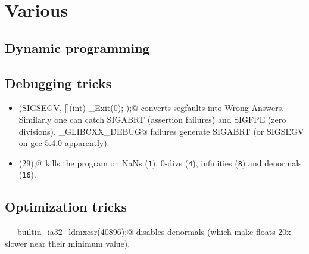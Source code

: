 \chapter{Various}



\section{Dynamic programming}

\section{Debugging tricks}
	\begin{itemize}
		\item \verb@signal(SIGSEGV, [](int) { _Exit(0); });@ converts segfaults into Wrong Answers.
			Similarly one can catch SIGABRT (assertion failures) and SIGFPE (zero divisions).
			\verb@_GLIBCXX_DEBUG@ failures generate SIGABRT (or SIGSEGV on gcc 5.4.0 apparently).
		\item \verb@feenableexcept(29);@ kills the program on NaNs (\texttt 1), 0-divs (\texttt 4), infinities (\texttt 8) and denormals (\texttt{16}).
	\end{itemize}

\section{Optimization tricks}
	\verb@__builtin_ia32_ldmxcsr(40896);@ disables denormals (which make floats 20x slower near their minimum value).
